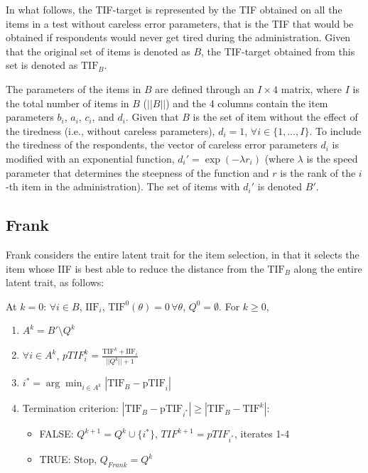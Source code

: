 \documentclass{svproc}
\begin{document}
In what follows, the TIF-target is represented by the TIF obtained on all the items in a test without careless error parameters, that is the TIF that would be obtained if respondents would never get tired during the administration. Given that the original set of items is denoted as $B$, the TIF-target obtained from this set is denoted as $\text{TIF}_B$.

The parameters of the items in $B$ are defined through an $I \times 4$ matrix, where $I$ is the total number of items in $B$ ($||B||$) and the 4 columns contain the item parameters $b_i$, $a_i$, $c_i$, and $d_i$. 
Given that $B$ is the set of item without the effect of the tiredness (i.e., without careless parameters), $d_i = 1$, $\forall i \in \{1, \ldots, I\}$. To include the tiredness of the respondents, the vector of careless error parameters $d_i$ is modified with an exponential function, $d_i' = \exp(-\lambda r_i)$ (where $\lambda$ is the speed parameter that determines the steepness of the function and $r$ is the rank of the $i$-th item in the administration).
The set of items with $d_i'$ is denoted $B'$.


\subsection{Frank}


Frank considers the entire latent trait for the item selection, in that it selects the item whose IIF is best able to reduce the distance from the $\text{TIF}_B$ along the entire latent trait, as follows:


At $k = 0$: $\forall i \in B$, $\text{IIF}_i$, $\text{TIF}^0(\theta) = 0 \, \forall \theta$, $Q^0 = \emptyset$. For $k \geq 0$,

\begin{enumerate}
	\item  $A^k = B' \setminus Q^k$ 
	\item $\forall i \in A^k$, $pTIF_{i}^k = \frac{\text{TIF}^k + \text{IIF}_{i}}{||Q^k||+1}$
	\item $i^* = \arg \min_{i \in A^k} |\text{TIF}_B - \text{pTIF}_i|$
	\item Termination criterion: $|\text{TIF}_B - \text{pTIF}_{i^*}| \geq |\text{TIF}_B - \text{TIF}^{k}|$: 
	\begin{itemize}
		\item FALSE:  $Q^{k+1} = Q^{k} \cup \{i^*\}$, $TIF^{k+1} = pTIF_{i^*}$, iterates 1-4 
		\item TRUE: Stop, %
		$Q_{Frank} = Q^k$
		
	\end{itemize}
\end{enumerate}
\end{document}
